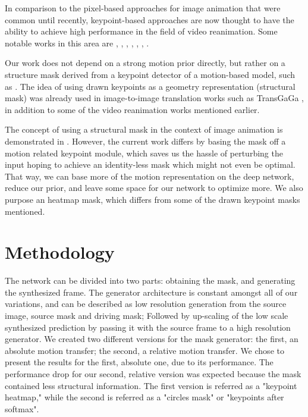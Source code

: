 \documentclass{article}
\begin{document}
In comparison to the pixel-based approaches for image animation that were
common until recently, keypoint-based approaches are now thought to have
the ability to achieve high performance in the field of video reanimation.
Some notable works in
this area are \cite{siarohin2020order},
\cite{siarohin2019animating}, \cite{kim2019unsupervised},
\cite{balakrishnan2018synthesizing}, \cite{ma2017pose},
\cite{reed2017parallel}, \cite{chan2019everybody}.


Our work does not depend on a strong
motion prior directly, but rather on a
structure mask derived from a keypoint detector of a motion-based model,
such as \cite{siarohin2020order}. The idea of using drawn keypoints as a
geometry representation (structural mask) was already used in image-to-image
translation works such as TransGaGa \cite{wu2019transgaga}, in addition to
some of the video reanimation works mentioned earlier.

The concept of using a structural mask in the context of image animation is
demonstrated in \cite{shalev2020image}. However, the current work differs
by basing the mask off a motion related keypoint module, which saves us the hassle
of perturbing the input hoping to achieve an identity-less mask which might
not even be optimal. That way, we
can base more of the motion representation on the deep network, reduce our
prior, and leave some space for our network to optimize more. We also
purpose an heatmap mask, which differs from some of the drawn keypoint
masks mentioned.

\section{Methodology}
The network can be divided into two parts: obtaining the mask, and generating
the synthesized frame. The generator architecture is constant amongst all of
our variations, and can be described as low resolution generation from the
source image, source mask and driving mask; Followed by up-scaling of the
low scale synthesized prediction by passing it with the source frame to a
high resolution generator.
We created two different versions for the mask generator: the first, an
absolute motion transfer; the second,  a relative motion transfer. We chose
to present the results for the first, absolute one, due to its performance.
The performance drop for our second, relative version was expected because the
mask contained less structural information.
The first version is referred as a "keypoint heatmap," while the second is referred as a "circles mask" or "keypoints after softmax".
\end{document}
